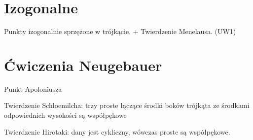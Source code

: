 
\section{Izogonalne}
Punkty izogonalnie sprzężone w trójkącie. + Twierdzenie Menelausa. (UW1)

\section{Ćwiczenia Neugebauer}
Punkt Apoloniusza

Twierdzenie Schloemilcha: trzy proste łączące środki boków trójkąta ze środkami odpowiednich wysokości są współpękowe %

Twierdzenie Hirotaki: dany jest cykliczny, wówczas proste są współpękowe.